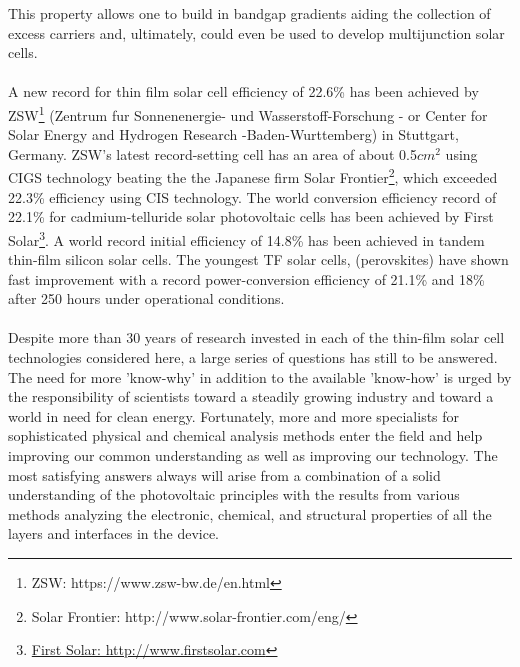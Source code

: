 This property allows one to build in bandgap gradients aiding the collection of excess carriers and, ultimately, could even be used to develop multijunction solar cells. 
\\
\\
A new record for thin film solar cell  efficiency of  22.6\% has been achieved by ZSW\footnote{ZSW: https://www.zsw-bw.de/en.html} (Zentrum fur Sonnenenergie- und Wasserstoff-Forschung - or Center for Solar Energy and Hydrogen Research -Baden-Wurttemberg) in Stuttgart, Germany. ZSW's latest record-setting cell has an area of about 0.5$cm^2$ using CIGS technology\cite{ZSW} beating the the Japanese firm Solar Frontier\footnote{Solar Frontier: http://www.solar-frontier.com/eng/}, which exceeded 22.3\% efficiency using CIS technology\cite{frontier}.
The  world conversion efficiency record of 22.1\% for cadmium-telluride solar photovoltaic cells has been achieved by First Solar\footnote{\href{here}{First Solar: http://www.firstsolar.com}}\cite{Firstsolar}. A world record initial efficiency of 14.8\% has been achieved in tandem thin-film silicon solar cells\cite{silicon}. The youngest TF solar cells, (perovskites) have shown fast improvement with a  record power-conversion efficiency of 21.1\% and 18\% after 250 hours under operational conditions\cite{perovskite}.
\\
\\Despite more than 30 years of research invested in each of the thin-film solar cell technologies considered here, a large series of questions has still to be answered. The need for more 'know-why' in addition to the available 'know-how' is urged by the responsibility of scientists toward a steadily growing industry and toward a world in need for clean energy. Fortunately, more and more specialists for sophisticated physical and chemical analysis methods enter the field and help improving our common understanding as well as improving our technology. The most satisfying answers always will arise from a combination of a solid understanding of the photovoltaic principles with the results from various methods analyzing the electronic, chemical, and structural properties of all the layers and interfaces in the device.